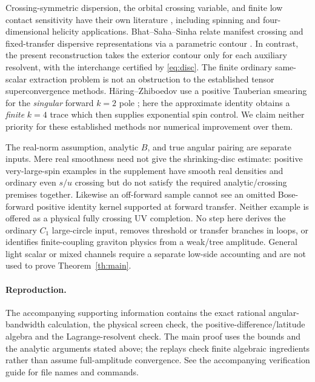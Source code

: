 \documentclass[11pt,a4paper]{article}
\theoremstyle{definition}
\theoremstyle{remark}
\begin{document}
Crossing-symmetric dispersion, the orbital crossing variable, and finite low contact sensitivity have their own literature \cite{SZ,SpinCSDR,CPM,Pas}, including spinning and four-dimensional helicity applications. Bhat--Saha--Sinha relate manifest crossing and fixed-transfer dispersive representations via a parametric contour \cite[Secs.~2--3]{BSS}. In contrast, the present reconstruction takes the exterior contour only for each auxiliary resolvent, with the interchange certified by \eqref{eq:disc}. The finite ordinary same-scalar extraction problem is not an obstruction to the established tensor superconvergence methods. H\"aring--Zhiboedov use a positive Tauberian smearing for the \emph{singular} forward $k=2$ pole \cite[Sec.~3.2]{HZ}; here the approximate identity obtains a \emph{finite} $k=4$ trace which then supplies exponential spin control. We claim neither priority for these established methods nor numerical improvement over them.

The real-norm assumption, analytic $B$, and true angular pairing are separate inputs. Mere real smoothness need not give the shrinking-disc estimate: positive very-large-spin examples in the supplement have smooth real densities and ordinary even $s/u$ crossing but do not satisfy the required analytic/crossing premises together. Likewise an off-forward sample cannot see an omitted Bose-forward positive identity kernel supported at forward transfer. Neither example is offered as a physical fully crossing UV completion. No step here derives the ordinary $C_1$ large-circle input, removes threshold or transfer branches in loops, or identifies finite-coupling graviton physics from a weak/tree amplitude. General light scalar or mixed channels require a separate low-side accounting and are not used to prove Theorem~\ref{th:main}.

\paragraph{Reproduction.}
The accompanying supporting information contains the exact rational angular-bandwidth calculation, the physical screen check, the positive-difference/latitude algebra and the Lagrange-resolvent check. The main proof uses the bounds and the analytic arguments stated above; the replays check finite algebraic ingredients rather than assume full-amplitude convergence. See the accompanying verification guide for file names and commands.


\end{document}
